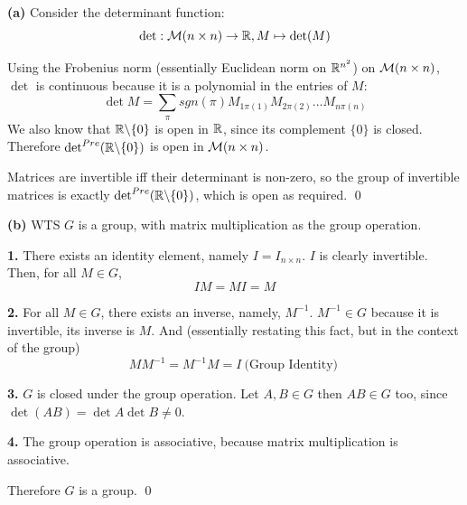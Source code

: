 \documentclass[a4paper, 12pt]{article}
\begin{document}
\begin{solution}
    \textbf{(a)} Consider the determinant function: \[
        \det: \mathcal{M}(n \times n) \to \mathbb{R}, M \mapsto \det(M)
    \]

    Using the Frobenius norm (essentially Euclidean norm on $\mathbb{R}^{n^2}$) on $\mathcal{M}(n \times n)$, $\det$ is continuous because it is a polynomial in the entries of $M$:
    \[
        \det M = \sum_{\pi} sgn(\pi) M_{1\pi(1)} M_{2\pi(2)}\ldots M_{n\pi(n)}
    \]
    We also know that $\mathbb{R} \backslash \{0\}$ is open in $\mathbb{R}$, since its complement $\{0\}$ is closed. Therefore $\det^{Pre}(\mathbb{R}\backslash \{0\})$ is open in $\mathcal{M}(n \times n)$.

    Matrices are invertible iff their determinant is non-zero, so the group of invertible matrices is exactly $\det^{Pre}(\mathbb{R}\backslash \{0\})$, which is open as required. \qed

    \textbf{(b)} WTS $G$ is a group, with matrix multiplication as the group operation.

    \textbf{1.} There exists an identity element, namely $I = I_{n \times n}$. $I$ is clearly invertible. Then, for all $M \in G$, \[
        IM = MI = M
    \]

    \textbf{2.} For all $M \in G$, there exists an inverse, namely, $M^{-1}$. $M^{-1} \in G$ because it is invertible, its inverse is $M$. And (essentially restating this fact, but in the context of the group)\[
        M M^{-1} = M^{-1} M = I \:\text{(Group Identity)}\:
    \]

    \textbf{3.} $G$ is closed under the group operation. Let $A, B \in G$ then $AB \in G$ too, since $\det (AB) = \det A \det B \neq 0$.

    \textbf{4.} The group operation is associative, because matrix multiplication is associative.

    Therefore $G$ is a group. \qed






\end{solution}
\end{document}
